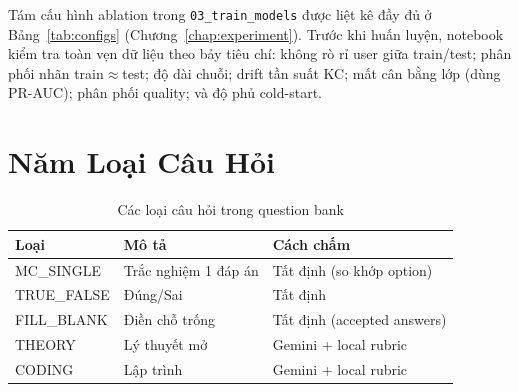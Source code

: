 \documentclass[12pt, a4paper]{report}
\begin{document}
\noindent Tám cấu hình ablation trong \texttt{03\_train\_models} được liệt kê đầy đủ ở Bảng~\ref{tab:configs} (Chương~\ref{chap:experiment}). Trước khi huấn luyện, notebook kiểm tra toàn vẹn dữ liệu theo bảy tiêu chí: không rò rỉ user giữa train/test; phân phối nhãn train$\approx$test; độ dài chuỗi; drift tần suất KC; mất cân bằng lớp (dùng PR-AUC); phân phối quality; và độ phủ cold-start.

\section{Năm Loại Câu Hỏi}
\label{apx:qtypes}

\begin{table}[H]
  \centering
  \caption{Các loại câu hỏi trong question bank}
  \begin{tabular}{lll}
    \toprule
    \textbf{Loại} & \textbf{Mô tả} & \textbf{Cách chấm} \\
    \midrule
    MC\_SINGLE  & Trắc nghiệm 1 đáp án & Tất định (so khớp option) \\
    TRUE\_FALSE & Đúng/Sai            & Tất định \\
    FILL\_BLANK & Điền chỗ trống      & Tất định (accepted answers) \\
    THEORY      & Lý thuyết mở        & Gemini + local rubric \\
    CODING      & Lập trình           & Gemini + local rubric \\
    \bottomrule
  \end{tabular}
\end{table}


\printbibliography[heading=bibintoc, title={Tài liệu tham khảo}]
\end{document}
